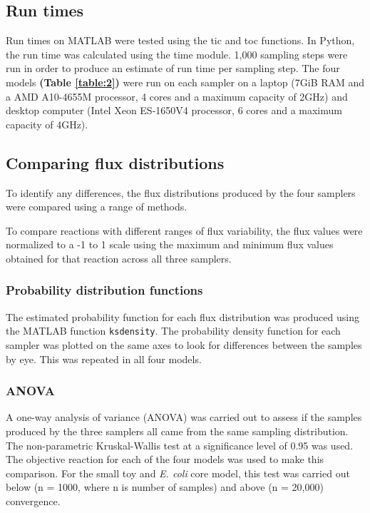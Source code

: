 \documentclass[10pt,letterpaper]{article}
\begin{document}
\subsection*{Run times}
Run times on MATLAB were tested using the tic and toc functions\cite{tictoc}. In Python, the run time was calculated using the time module\cite{time}. 1,000 sampling steps were run in order to produce an estimate of run time per sampling step. The four models \textbf{(Table \ref{table:2})} were run on each sampler on a laptop (7GiB RAM and a AMD A10-4655M processor, 4 cores and a maximum capacity of 2GHz) and desktop computer (Intel Xeon ES-1650V4 processor, 6 cores and a maximum capacity of 4GHz). 

\subsection*{Comparing flux distributions} 
To identify any differences, the flux distributions produced by the four samplers were compared using a range of methods. 

To compare reactions with different ranges of flux variability, the flux values were normalized to a -1 to 1 scale using the maximum and minimum flux values obtained for that reaction across all three samplers.

\subsubsection*{Probability distribution functions}
The estimated probability function for each flux distribution was produced using the MATLAB function \texttt{ksdensity}\cite{ksdensity}. The probability density function for each sampler was plotted on the same axes to look for differences between the samples by eye. This was repeated in all four models.

\subsubsection*{ANOVA}
A one-way analysis of variance (ANOVA) was carried out to assess if the samples produced by the three samplers all came from the same sampling distribution. The non-parametric Kruskal-Wallis test at a significance level of 0.95 was used. The objective reaction for each of the four models was used to make this comparison. For the small toy and \textit{E. coli} core model, this test was carried out below (n = 1000, where n is number of samples) and above (n = 20,000) convergence.
\end{document}
